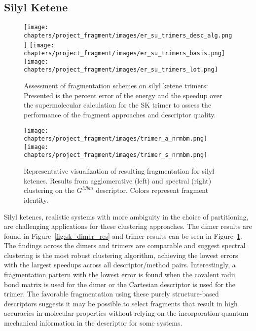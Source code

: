 \subsection{Silyl Ketene}
\label{subsec:resultssk}

\begin{figure}
    \centering
    \label{fig:sk_trimer_res}
    \texttt{[image: chapters/project\_fragment/images/er\_su\_trimers\_desc\_alg.png]}
    \texttt{[image: chapters/project\_fragment/images/er\_su\_trimers\_basis.png]}
    \texttt{[image: chapters/project\_fragment/images/er\_su\_trimers\_lot.png]}

    \caption[Assessment of UML fragmentation schemes on silyl ketene trimers]{Assessment of fragmentation schemes on silyl ketene trimers: Presented is the percent error of the energy and the speedup over the supermolecular calculation for the SK trimer to assess the performance of the fragment approaches and descriptor quality.}
\end{figure}

\begin{figure}
    \centering
    \label{fig:sk_trimer_vis}
        \texttt{[image: chapters/project\_fragment/images/trimer\_a\_nrmbm.png]}
        \texttt{[image: chapters/project\_fragment/images/trimer\_s\_nrmbm.png]}
    \caption[Representative visualization of fragmentation for silyl ketene trimer]{Representative visualization of resulting fragmentation for silyl ketenes. Results from agglomerative (left) and spectral (right) clustering on the $G^{Mbm}$ descriptor. Colors represent fragment identity.}
\end{figure}

Silyl ketenes, realistic systems with more ambiguity in the choice of partitioning, are challenging applications for these clustering approaches.
The dimer results are found in Figure~\ref{fig:sk_dimer_res} and trimer results can be seen in Figure~\ref{fig:sk_trimer_res}.
The findings across the dimers and trimers are comparable and suggest spectral clustering is the most robust clustering algorithm, achieving the lowest errors with the largest speedups across all descriptor/method pairs. 
Interestingly, a fragmentation pattern with the lowest error is found when the covalent radii bond matrix is used for the dimer or the Cartesian descriptor is used for the trimer.
The favorable fragmentation using these purely structure-based descriptors suggests it may be possible to select fragments that result in high accuracies in molecular properties without relying on the incorporation quantum mechanical information in the descriptor for some systems.

